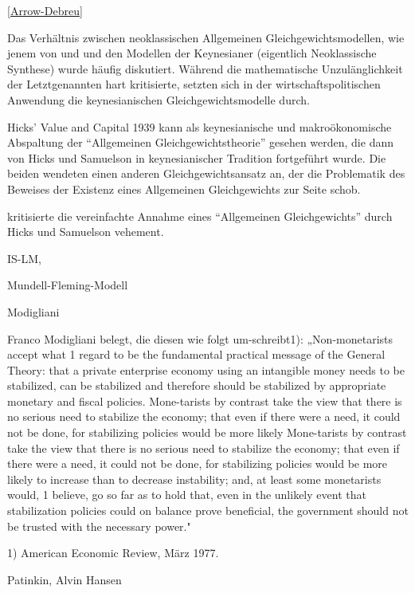 \ref{Arrow-Debreu}

Das Verhältnis zwischen neoklassischen Allgemeinen Gleichgewichtsmodellen, wie jenem von \textcite{Arrow1954} und \textcite{McKenzie1954} und den Modellen der Keynesianer (eigentlich Neoklassische Synthese) \textcite{Hicks1939} wurde häufig diskutiert. Während \textcite{Morgenstern1941} die mathematische Unzulänglichkeit der Letztgenannten hart kritisierte, setzten sich in der wirtschaftspolitischen Anwendung die keynesianischen Gleichgewichtsmodelle durch.



Hicks' Value and Capital 1939 \parencite[S. 20]{Weintraub1983} kann als keynesianische und makroökonomische Abspaltung der "`Allgemeinen Gleichgewichtstheorie"' gesehen werden, die dann von Hicks und Samuelson in keynesianischer Tradition fortgeführt wurde. 
Die beiden wendeten einen anderen Gleichgewichtsansatz an, der die Problematik des Beweises der Existenz eines Allgemeinen Gleichgewichts zur Seite schob.\parencite[S. 21]{Weintraub1983}

\textcite{Morgenstern1941} kritisierte die vereinfachte Annahme eines "`Allgemeinen Gleichgewichts"' durch Hicks und Samuelson vehement. 

IS-LM, 


Mundell-Fleming-Modell


Modigliani

Franco Modigliani belegt, die diesen wie folgt um-schreibt1): „Non-monetarists accept what 1 regard to be the fundamental practical message of the General Theory: that a private enterprise economy using an intangible money needs to be stabilized, can be stabilized and therefore should be stabilized by appropriate monetary and fiscal policies. Mone-tarists by contrast take the view that there is no serious need to stabilize the economy; that even if there were a need, it could not be done, for stabilizing policies would be more likely
Mone-tarists by contrast take the view that there is no serious need to stabilize the economy; that even if there were a need, it could not be done, for stabilizing policies would be more likely to increase than to decrease instability; and, at least some monetarists would, 1 believe, go so far as to hold that, even in the unlikely event that stabilization policies could on balance prove beneficial, the government should not be trusted with the necessary power."

1) American Economic Review, März 1977.

Patinkin, Alvin Hansen

